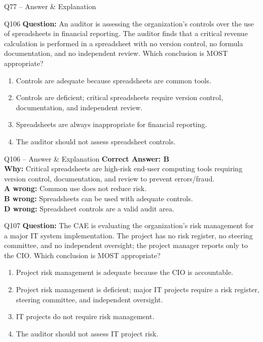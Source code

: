 \documentclass[aspectratio=169,10pt]{beamer}
\begin{document}
\begin{frame}[t]{Q77 -- Answer \& Explanation}
	\begin{frame}[t]{Q106}
		\small
		\textbf{Question:} An auditor is assessing the organization's controls over the use of spreadsheets in financial reporting. The auditor finds that a critical revenue calculation is performed in a spreadsheet with no version control, no formula documentation, and no independent review. Which conclusion is MOST appropriate?
		\begin{enumerate}[label=\Alph*.,itemsep=1pt,topsep=2pt]
			\item Controls are adequate because spreadsheets are common tools.
			\item Controls are deficient; critical spreadsheets require version control, documentation, and independent review.
			\item Spreadsheets are always inappropriate for financial reporting.
			\item The auditor should not assess spreadsheet controls.
		\end{enumerate}
	\end{frame}
	
	\begin{frame}[t]{Q106 -- Answer \& Explanation}
		\small
		\textbf{Correct Answer: B} \\[4pt]
		\textbf{Why:} Critical spreadsheets are high-risk end-user computing tools requiring version control, documentation, and review to prevent errors/fraud. \\[4pt]
		\textbf{A wrong:} Common use does not reduce risk. \\[2pt]
		\textbf{B wrong:} Spreadsheets can be used with adequate controls. \\[2pt]
		\textbf{D wrong:} Spreadsheet controls are a valid audit area.
	\end{frame}
	
	\begin{frame}[t]{Q107}
		\small
		\textbf{Question:} The CAE is evaluating the organization's risk management for a major IT system implementation. The project has no risk register, no steering committee, and no independent oversight; the project manager reports only to the CIO. Which conclusion is MOST appropriate?
		\begin{enumerate}[label=\Alph*.,itemsep=1pt,topsep=2pt]
			\item Project risk management is adequate because the CIO is accountable.
			\item Project risk management is deficient; major IT projects require a risk register, steering committee, and independent oversight.
			\item IT projects do not require risk management.
			\item The auditor should not assess IT project risk.
		\end{enumerate}
	\end{frame}
	

\end{frame}
\end{document}
